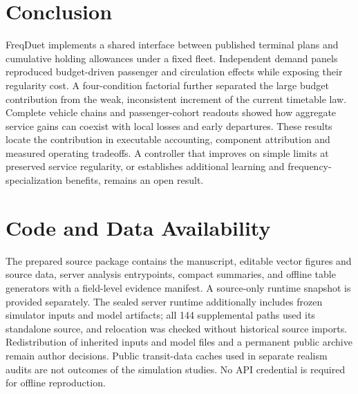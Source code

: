 \documentclass[letterpaper,journal]{IEEEtran}
\begin{document}
\section{Conclusion}
FreqDuet implements a shared interface between published terminal plans and cumulative holding allowances under a fixed fleet. Independent demand panels reproduced budget-driven passenger and circulation effects while exposing their regularity cost. A four-condition factorial further separated the large budget contribution from the weak, inconsistent increment of the current timetable law. Complete vehicle chains and passenger-cohort readouts showed how aggregate service gains can coexist with local losses and early departures. These results locate the contribution in executable accounting, component attribution and measured operating tradeoffs. A controller that improves on simple limits at preserved service regularity, or establishes additional learning and frequency-specialization benefits, remains an open result.
\section*{Code and Data Availability}
The prepared source package contains the manuscript, editable vector figures and source data, server analysis entrypoints, compact summaries, and offline table generators with a field-level evidence manifest. A source-only runtime snapshot is provided separately. The sealed server runtime additionally includes frozen simulator inputs and model artifacts; all 144 supplemental paths used its standalone source, and relocation was checked without historical source imports. Redistribution of inherited inputs and model files and a permanent public archive remain author decisions. Public transit-data caches used in separate realism audits are not outcomes of the simulation studies. No API credential is required for offline reproduction.


\end{document}
